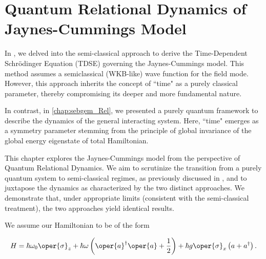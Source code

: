 \chapter{Quantum Relational Dynamics of Jaynes-Cummings Model
\label{chap5:RDQ_JCM_chap}}

In , we delved into the semi-classical approach to derive the Time-Dependent Schrödinger Equation (TDSE) governing the Jaynes-Cummings model. 
This method assumes a semiclassical (WKB-like) wave function for the field mode. However, 
this approach inherits the concept of ``time" as a purely classical parameter, thereby compromising its deeper and more fundamental nature.

In contrast, in \ref{chap:sebgem_Rel}, we presented a purely quantum framework to describe the dynamics of the general interacting system. Here, ``time" 
emerges as a symmetry parameter stemming from the principle of global invariance of the global energy 
eigenstate of total Hamiltonian.

This chapter explores the Jaynes-Cummings model from the perspective of Quantum Relational Dynamics. 
We aim to scrutinize the transition from a purely quantum system to semi-classical regimes, 
as previously discussed in , and to juxtapose the dynamics as 
characterized by the two distinct approaches. We demonstrate that, under appropriate limits
(consistent with the semi-classical treatment), the two approaches yield identical results. 

We assume our Hamiltonian to be of the form

\begin{eqnarray}
        \label{eq:chap5_JCM_Hamiltonian}
        H = \hbar \omega_0 \oper{\sigma}_z + \hbar \omega \left(\oper{a}^\dagger \oper{a} + \frac{1}{2}\right) 
        + \hbar g \oper{\sigma}_x\left(a + a^\dagger\right). 
\end{eqnarray}